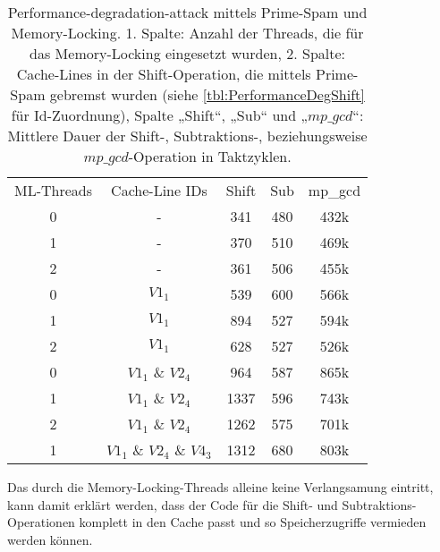 \begin{table}[h]
\caption{Performance-degradation-attack mittels Prime-Spam und Memory-Locking. 1. Spalte: Anzahl der Threads, die für das Memory-Locking eingesetzt wurden, 2. Spalte: Cache-Lines in der Shift-Operation, die mittels Prime-Spam gebremst wurden (siehe \ref{tbl:PerformanceDegShift} für Id-Zuordnung), Spalte „Shift“, „Sub“ und „$mp\_gcd$“: Mittlere Dauer der Shift-, Subtraktions-, beziehungsweise $mp\_gcd$-Operation in Taktzyklen.}
\label{tbl:MemoryLockingResults}
\begin{tabular}{ccccc}
ML-Threads & Cache-Line IDs     & Shift & Sub & mp\_gcd \\
0                   & -               & 341   & 480 & 432k    \\
1                   & -               & 370   & 510 & 469k    \\
2                   & -               & 361   & 506 & 455k    \\
0                   & $V1_1$              & 539   & 600 & 566k    \\
1                   & $V1_1$              & 894   & 527 & 594k    \\
2                   & $V1_1$              & 628   & 527 & 526k    \\
0                   & $V1_1$ \& $V2_4$        & 964   & 587 & 865k    \\
1                   & $V1_1$ \& $V2_4$        & 1337  & 596 & 743k    \\
2                   & $V1_1$ \& $V2_4$        & 1262  & 575 & 701k    \\
1                   & $V1_1$ \& $V2_4$ \& $V4_3$ & 1312  & 680 & 803k   
\end{tabular}
\end{table}

Das durch die Memory-Locking-Threads alleine keine Verlangsamung eintritt, kann damit erklärt werden, dass der Code für die Shift- und Subtraktions-Operationen komplett in den Cache passt und so Speicherzugriffe vermieden werden können.


